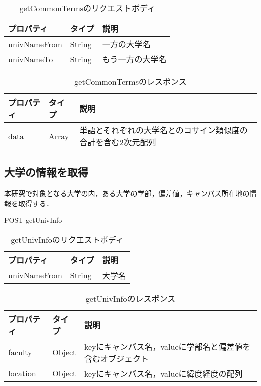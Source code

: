 \begin{table}[htbp]
\caption{getCommonTermsのリクエストボディ}
\centering
\begin{tabular}{lll}
\hline
プロパティ & タイプ & 説明
\\ \hline \hline
univNameFrom & String & 一方の大学名\\ 
univNameTo & String & もう一方の大学名\\ \hline
\end{tabular}
\end{table}

\begin{table}[htbp]
\caption{getCommonTermsのレスポンス}
\centering
\begin{tabular}{lll}
\hline
プロパティ & タイプ & 説明
\\ \hline \hline
data & Array & 単語とそれぞれの大学名とのコサイン類似度の合計を含む2次元配列\\  \hline
\end{tabular}
\end{table}

\subsection{大学の情報を取得}
本研究で対象となる大学の内，ある大学の学部，偏差値，キャンパス所在地の情報を取得する．

POST getUnivInfo

\begin{table}[htbp]
\caption{getUnivInfoのリクエストボディ}
\centering
\begin{tabular}{lll}
\hline
プロパティ & タイプ & 説明
\\ \hline \hline
univNameFrom & String & 大学名\\  \hline
\end{tabular}
\end{table}

\begin{table}[htbp]
\caption{getUnivInfoのレスポンス}
\centering
\begin{tabular}{lll}
\hline
プロパティ & タイプ & 説明
\\ \hline \hline
faculty & Object & keyにキャンパス名，valueに学部名と偏差値を含むオブジェクト \\
location & Object & keyにキャンパス名，valueに緯度経度の配列 \\ \hline
\end{tabular}
\end{table}